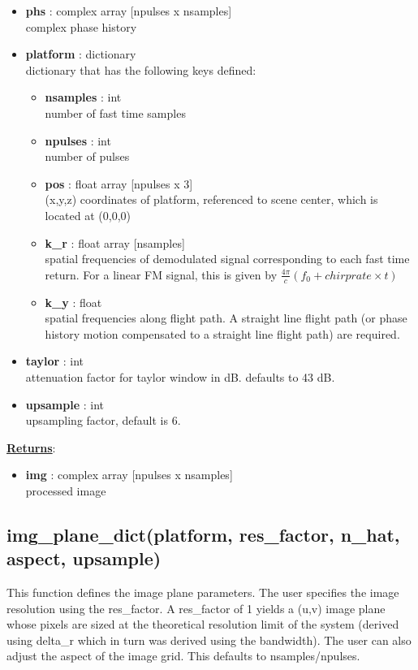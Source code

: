 \documentclass{article}
\newcommand{\defs}[2]{\textbf{{#1}} : {#2}}
\begin{document}
\begin{itemize}
	\item \defs{phs}{complex array [npulses x nsamples]}\\
  	complex phase history
  	\item \defs{platform}{dictionary}\\
  	dictionary that has the following keys defined:
	\begin{itemize}
    	\item \defs{nsamples}{int}\\
    		number of fast time samples
	    \item \defs{npulses}{int}\\
	    	number of pulses
	    \item \defs{pos}{float array [npulses x 3]}\\
	       	(x,y,z) coordinates of platform, referenced to scene center, which is located at (0,0,0)
	    \item\defs{k\_r}{float array [nsamples]}\\
	    	spatial frequencies of demodulated signal corresponding to each fast time return.  For a linear FM signal, this is given by $\frac{4\pi}{c}(f_0+chirprate\times t)$
	    \item\defs{k\_y}{float}\\
	    	spatial frequencies along flight path.  A straight line flight path (or phase history motion compensated to a straight line flight path) are required.
	\end{itemize}
	\item\defs{taylor}{int}\\
	attenuation factor for taylor window in dB.  defaults to 43 dB.
	\item\defs{upsample}{int}\\
	upsampling factor, default is 6.
\end{itemize}

\noindent \underline{\textbf{Returns}}:
\begin{itemize}
	\item \defs{img}{complex array [npulses x nsamples]}\\
	processed image
\end{itemize} 

\newpage

\subsection{img\_plane\_dict(platform, res\_factor, n\_hat, aspect, upsample)}
\label{sec:img_dict}
This function defines the image plane parameters.  The user specifies the image resolution using the res\_factor.  A res\_factor of 1 yields a (u,v) image plane whose pixels are sized at the theoretical resolution limit of the system (derived using delta\_r which in turn was derived using the bandwidth).  The user can also adjust the aspect of the image grid.  This defaults to nsamples/npulses.
\end{document}
